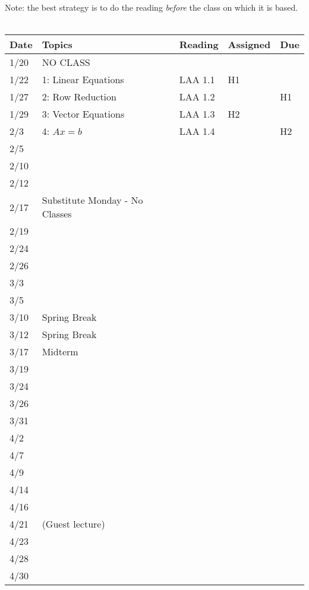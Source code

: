 \documentclass[11pt]{article}
\begin{document}
Note: the best strategy is to do the reading \emph{before} the class on
which it is based.   
\\~\\
\small
\begin{centering}
\begin{tabular}{||l|p{3in}|l|l|l||}
\hline\hline
Date & Topics  & Reading & Assigned & Due  \\
\hline\hline
1/20 & NO CLASS &&& \\
1/22 & 1: Linear Equations & LAA 1.1 & H1  & \\
\hline

1/27 & 2: Row Reduction & LAA 1.2 & & H1 \\
1/29 & 3: Vector Equations & LAA 1.3 & H2 & \\
\hline

2/3 & 4: $Ax = b$ & LAA 1.4 & & H2 \\
2/5 & & & & \\
\hline

2/10 & & & & \\
2/12 & & & & \\
\hline

2/17 & Substitute Monday - No Classes & & &\\
2/19 & & & &\\
\hline

2/24 & & & &\\
2/26 & & & &\\
\hline

3/3 & & & &\\
3/5 & & & &\\
\hline

3/10 & Spring Break &&&\\
3/12 & Spring Break &&&\\
\hline

3/17 & Midterm & & &\\
3/19 & & & &\\
\hline

3/24 & & & &\\
3/26 & & & &\\
\hline

3/31 & & & &\\
4/2 & & & &\\
\hline

4/7 & & & &\\
4/9 & & & &\\
\hline

4/14 & & & &\\
4/16 & & & &\\
 \hline

4/21 & (Guest lecture) & & &\\
4/23 & & & & \\
\hline

4/28 & & & &\\
4/30 & & & &\\
\hline\hline

\end{tabular}\\
\end{centering}
\end{document}

